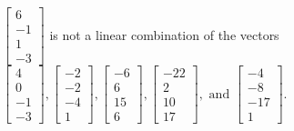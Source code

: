 \begin{exercise}
\begin{exerciseStatement}
  \end{exerciseStatement}
  \begin{exerciseAnswer}
   \(\left[\begin{array}{c}
6 \\
-1 \\
1 \\
-3
\end{array}\right]\) 
  	 is not  
	a linear combination of the vectors \(\left[\begin{array}{c}
4 \\
0 \\
-1 \\
-3
\end{array}\right] , \left[\begin{array}{c}
-2 \\
-2 \\
-4 \\
1
\end{array}\right] , \left[\begin{array}{c}
-6 \\
6 \\
15 \\
6
\end{array}\right] , \left[\begin{array}{c}
-22 \\
2 \\
10 \\
17
\end{array}\right] , \text{ and } \left[\begin{array}{c}
-4 \\
-8 \\
-17 \\
1
\end{array}\right]\).

	
  


  \end{exerciseAnswer}
\end{exercise}
